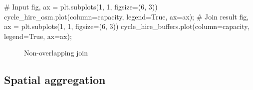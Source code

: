 \documentclass[
  letterpaper,
]{krantz}
\newenvironment{Shaded}{\begin{snugshade}}{\end{snugshade}}
\newcommand{\CommentTok}[1]{\textcolor[rgb]{0.37,0.37,0.37}{#1}}
\newcommand{\DecValTok}[1]{\textcolor[rgb]{0.68,0.00,0.00}{#1}}
\newcommand{\NormalTok}[1]{\textcolor[rgb]{0.00,0.23,0.31}{#1}}
\newcommand{\OperatorTok}[1]{\textcolor[rgb]{0.37,0.37,0.37}{#1}}
\newcommand{\StringTok}[1]{\textcolor[rgb]{0.13,0.47,0.30}{#1}}
\newcommand{\VariableTok}[1]{\textcolor[rgb]{0.07,0.07,0.07}{#1}}
\begin{document}
\begin{Shaded}
\begin{Highlighting}[]
\CommentTok{\# Input}
\NormalTok{fig, ax }\OperatorTok{=}\NormalTok{ plt.subplots(}\DecValTok{1}\NormalTok{, }\DecValTok{1}\NormalTok{, figsize}\OperatorTok{=}\NormalTok{(}\DecValTok{6}\NormalTok{, }\DecValTok{3}\NormalTok{))}
\NormalTok{cycle\_hire\_osm.plot(column}\OperatorTok{=}\StringTok{\textquotesingle{}capacity\textquotesingle{}}\NormalTok{, legend}\OperatorTok{=}\VariableTok{True}\NormalTok{, ax}\OperatorTok{=}\NormalTok{ax)}\OperatorTok{;}
\CommentTok{\# Join result}
\NormalTok{fig, ax }\OperatorTok{=}\NormalTok{ plt.subplots(}\DecValTok{1}\NormalTok{, }\DecValTok{1}\NormalTok{, figsize}\OperatorTok{=}\NormalTok{(}\DecValTok{6}\NormalTok{, }\DecValTok{3}\NormalTok{))}
\NormalTok{cycle\_hire\_buffers.plot(column}\OperatorTok{=}\StringTok{\textquotesingle{}capacity\textquotesingle{}}\NormalTok{, legend}\OperatorTok{=}\VariableTok{True}\NormalTok{, ax}\OperatorTok{=}\NormalTok{ax)}\OperatorTok{;}
\end{Highlighting}
\end{Shaded}

\begin{figure}

\begin{minipage}{0.50\linewidth}



\end{minipage}%
%
\begin{minipage}{0.50\linewidth}



\end{minipage}%

\caption{\label{fig-cycle-hire-z}Non-overlapping join}

\end{figure}%

\subsection{Spatial aggregation}\label{sec-vector-spatial-aggregation}
\end{document}
